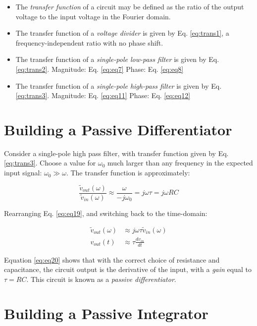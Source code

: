 \documentclass[12pt]{article}
\begin{document}
\begin{itemize}
\item The \textit{transfer function} of a circuit may be defined as the ratio of the output voltage to the input voltage in the Fourier domain.
\item The transfer function of a \textit{voltage divider} is given by Eq. \ref{eq:trans1}, a frequency-independent ratio with no phase shift.
\item The transfer function of a \textit{single-pole low-pass filter} is given by Eq. \ref{eq:trans2}.  Magnitude: Eq. \ref{eq:eq7} Phase: Eq. \ref{eq:eq8}
\item The transfer function of a \textit{single-pole high-pass filter} is given by Eq. \ref{eq:trans3}.  Magnitude: Eq. \ref{eq:eq11} Phase: Eq. \ref{eq:eq12}
\end{itemize}

\section{Building a Passive Differentiator}

Consider a single-pole high pass filter, with transfer function given by Eq. \ref{eq:trans3}.  Choose a value for $\omega_0$ much larger than any frequency in the expected input signal: $\omega_0 \gg \omega$.  The transfer function is approximately:

\begin{equation}
\frac{\tilde{v}_{out}(\omega)}{\tilde{v}_{in}(\omega)} \approx \frac{\omega}{-j\omega_0} = j\omega \tau = j\omega RC
\label{eq:eq19}
\end{equation}

Rearranging Eq. \ref{eq:eq19}, and switching back to the time-domain:

\begin{align}
\tilde{v}_{out}(\omega) &\approx j\omega \tau \tilde{v}_{in}(\omega) \\
v_{out}(t) &\approx \tau \frac{dv_{in}}{dt}
\label{eq:eq20}
\end{align}

Equation \ref{eq:eq20} shows that with the correct choice of resistance and capacitance, the circuit output is the derivative of the input, with a \textit{gain} equal to $\tau = RC$.  This circuit is known as a \textit{passive differentiator}.

\section{Building a Passive Integrator}
\end{document}
